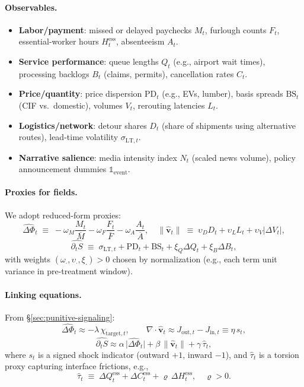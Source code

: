 \documentclass{article}
\begin{document}
\paragraph{Observables.}
\begin{itemize}
\item \textbf{Labor/payment}: missed or delayed paychecks $M_t$, furlough counts $F_t$,
essential-worker hours $H^{\mathrm{ess}}_t$, absenteeism $A_t$.
\item \textbf{Service performance}: queue lengths $Q_t$ (e.g., airport wait times),
processing backlogs $B_t$ (claims, permits), cancellation rates $C_t$.
\item \textbf{Price/quantity}: price dispersion $\mathrm{PD}_t$ (e.g., EVs, lumber),
basis spreads $\mathrm{BS}_t$ (CIF vs.\ domestic), volumes $V_t$, rerouting latencies $L_t$.
\item \textbf{Logistics/network}: detour shares $D_t$ (share of shipments using
alternative routes), lead-time volatility $\sigma_{\mathrm{LT},t}$.
\item \textbf{Narrative salience}: media intensity index $N_t$ (scaled news volume),
policy announcement dummies $\mathbb{1}_{\text{event}}$.
\end{itemize}

\paragraph{Proxies for fields.}
We adopt reduced-form proxies:
\[
\widehat{\Delta \Phi}_t \;\equiv\; - \omega_M \frac{M_t}{\overline{M}}
- \omega_F \frac{F_t}{\overline{F}}
- \omega_A \frac{A_t}{\overline{A}},
\quad
\|\widehat{\mathbf{v}}_t\| \;\equiv\; \upsilon_D D_t + \upsilon_L L_t + \upsilon_V \big|\Delta V_t\big|,
\]
\[
\widehat{\partial_t S} \;\equiv\; \sigma_{\mathrm{LT},t} + \mathrm{PD}_t + \mathrm{BS}_t
+ \xi_Q \Delta Q_t + \xi_B \Delta B_t,
\]
with weights $(\omega_\cdot,\upsilon_\cdot,\xi_\cdot)>0$ chosen by normalization
(e.g., each term unit variance in pre-treatment window).

\paragraph{Linking equations.}
From \S\ref{sec:punitive-signaling}:
\[
\widehat{\Delta \Phi}_t \approx -\lambda\,\chi_{\text{target},t},\qquad
\nabla\cdot \widehat{\mathbf{v}}_t \approx J_{\text{out},t} - J_{\text{in},t} \equiv \eta\,s_t,
\]
\[
\widehat{\partial_t S} \approx \alpha\,\big|\widehat{\Delta \Phi}_t\big| + \beta\,\|\widehat{\mathbf{v}}_t\|
+ \gamma\,\widehat{\tau}_t,
\]
where $s_t$ is a signed shock indicator (outward $+1$, inward $-1$), and
$\widehat{\tau}_t$ is a torsion proxy capturing interface frictions, e.g.,
\[
\widehat{\tau}_t \;\equiv\; \Delta Q^{\mathrm{ess}}_t + \Delta C^{\mathrm{ess}}_t
+ \varrho\,\Delta H^{\mathrm{ess}}_t,
\quad \varrho>0.
\]
\end{document}
